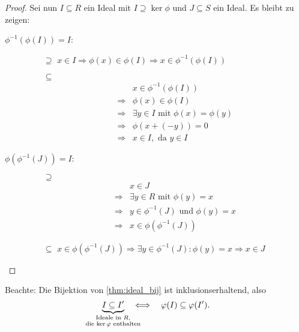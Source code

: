 \documentclass[12pt,a4paper]{scrartcl}
\begin{document}
\begin{proof}
	Sei nun $I \subseteq R$ ein Ideal mit $I \supseteq \ker\phi$ und $J \subseteq S$ ein Ideal. Es bleibt zu zeigen:
	\begin{description}
		\item[$\phi^{-1}(\phi(I)) = I$:] \leavevmode
		\begin{itemize}
			\item[\glqq $\supseteq$\grqq] $x\in I \Rightarrow \phi(x) \in \phi(I)\Rightarrow x\in \phi^{-1}(\phi(I))$
			\item[\glqq $\subseteq$\grqq] 
			\begin{align*}
				&x\in \phi^{-1}(\phi(I)) \\
				\Rightarrow & \phi(x)\in \phi(I) \\
				\Rightarrow & \exists y\in I \text{ mit } \phi(x) = \phi(y) \\
				\Rightarrow & \phi(x+(-y)) = 0 \\
				\Rightarrow & x\in I, \text{ da } y \in I
			\end{align*}
		\end{itemize}
		\item[$\phi(\phi^{-1}(J)) = I$:] \leavevmode
		\begin{itemize}
			\item[\glqq $\supseteq$\grqq] 
			\begin{align*}
				&x\in J \\
				\Rightarrow &\exists y\in R \text{ mit } \phi(y) = x \\
				\Rightarrow &y\in\phi^{-1}(J) \text{ und } \phi(y) = x \\
				\Rightarrow &x\in\phi(\phi^{-1}(J))
			\end{align*}
			\item[\glqq$\subseteq$\grqq] $x\in\phi(\phi^{-1}(J))\Rightarrow \exists y\in\phi^{-1}(J)\colon \phi(y) = x\Rightarrow x\in J$
    \qedhere
		\end{itemize}
	\end{description}
\end{proof}

\begin{bem} Beachte: Die Bijektion von \cref{thm:ideal_bij} ist inklusionserhaltend, also 
	\[
	\underbrace{I \subseteq I'}_{\mathclap{\substack{\text{Ideale in $R$,}\\\text{die $\ker\phi$ enthalten}}}} \quad \Longleftrightarrow \quad \phi(I) \subseteq \phi(I').
	\]
\end{bem}
\end{document}
